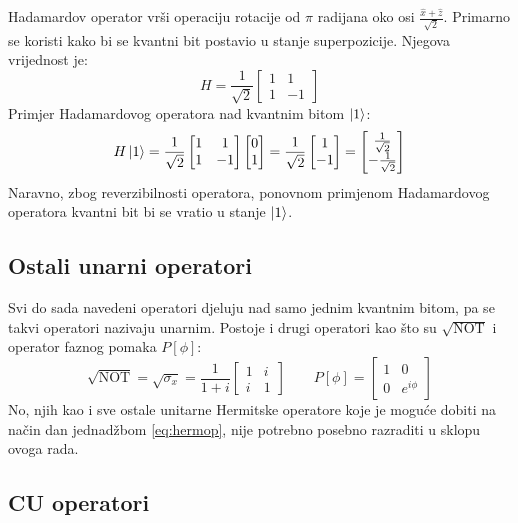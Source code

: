 Hadamardov operator vrši operaciju rotacije od $\pi$ radijana oko osi $\frac{\hat{x} + \hat{z}}{\sqrt{2}}$. Primarno se koristi kako bi se kvantni bit postavio u stanje superpozicije. Njegova vrijednost je:
\[
H = \frac{1}{\sqrt{2}}\begin{bmatrix}
1 & 1 \\ 1 & -1
\end{bmatrix}
\]
Primjer Hadamardovog operatora nad kvantnim bitom $\ket{1}$:
\[
H\ket{1} = \frac{1}{\sqrt{2}}\begin{bmatrix}
1 & 1 \\ 1 & -1
\end{bmatrix}
\begin{bmatrix}
0 \\ 1
\end{bmatrix}
= \frac{1}{\sqrt{2}} \begin{bmatrix} 1 \\ -1
\end{bmatrix}
= \begin{bmatrix}
\frac{1}{\sqrt{2}} \\ -\frac{1}{\sqrt{2}}
\end{bmatrix}
\]
Naravno, zbog reverzibilnosti operatora, ponovnom primjenom Hadamardovog operatora kvantni bit bi se vratio u stanje $\ket{1}$.

\subsection{Ostali unarni operatori}

Svi do sada navedeni operatori djeluju nad samo jednim kvantnim bitom, pa se takvi operatori nazivaju unarnim. Postoje i drugi operatori kao što su $\sqrt{\text{NOT}}$ i operator faznog pomaka $P[\phi]$:
\[
\sqrt{\text{NOT}} = \sqrt{\sigma_x} = \frac{1}{1+i}\begin{bmatrix}
1 & i \\ i & 1
\end{bmatrix}
\qquad
P[\phi] = \begin{bmatrix}
1 & 0 \\ 0 & e^{i\phi}
\end{bmatrix}
\]
No, njih kao i sve ostale unitarne Hermitske operatore koje je moguće dobiti na način dan jednadžbom \ref{eq:hermop}, nije potrebno posebno razraditi u sklopu ovoga rada. 

\subsection{CU operatori}

